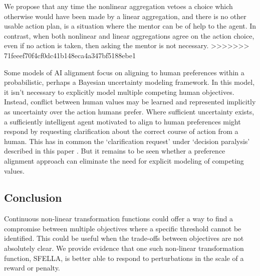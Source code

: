 We propose that any time the nonlinear aggregation vetoes a choice which otherwise would have been made by a linear aggregation, and there is no other usable action plan, is a situation where the mentor can be of help to the agent. %
In contrast, when both nonlinear and linear aggregations agree on the action choice, even if no action is taken, then asking the mentor is not necessary.
>>>>>>> 71feeef70f4cf0dc41b148eca4a347bf5188ebe1

Some models of AI alignment focus on \cite{russell2019human} aligning to human preferences within a probabilistic, perhaps a Bayesian uncertainty modeling framework.  In this model, it isn't necessary to explicitly model multiple competing human objectives. Instead, conflict between human values may be learned and represented implicitly as uncertainty over the action humans prefer. Where sufficient uncertainty exists, a sufficiently intelligent agent motivated to align to human preferences might respond by requesting clarification about the correct course of action from a human. This has in common the `clarification request' under `decision paralysis' described in this paper%
. But it remains to be seen whether a preference alignment approach can eliminate the need for explicit modeling of competing values.

\subsection{Conclusion}

Continuous non-linear transformation functions could offer a way to find a compromise between multiple objectives where a specific threshold cannot be identified. This could be useful when the trade-offs between objectives are not absolutely clear. We provide evidence that one such non-linear transformation function, SFELLA, is better able to respond to perturbations in the scale of a reward or penalty.